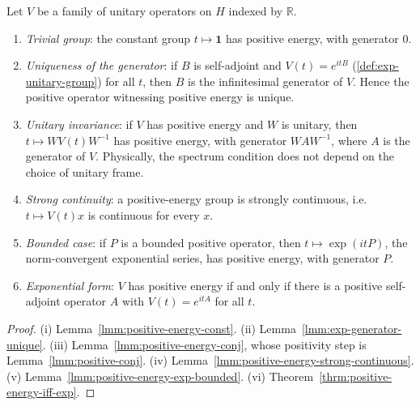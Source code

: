 \begin{theorem}
    \label{thrm:positive-energy-api}
    \leanok
    Let $V$ be a family of unitary operators on $H$ indexed by $\mathbb{R}$.
    \begin{enumerate}
        \item[(i)] \emph{Trivial group}: the constant group $t \mapsto \mathbf{1}$ has positive energy, with generator $0$.
        \item[(ii)] \emph{Uniqueness of the generator}: if $B$ is self-adjoint and $V(t) = e^{itB}$ (\ref{def:exp-unitary-group}) for all $t$, then $B$ is the infinitesimal generator of $V$. Hence the positive operator witnessing positive energy is unique.
        \item[(iii)] \emph{Unitary invariance}: if $V$ has positive energy and $W$ is unitary, then $t \mapsto WV(t)W^{-1}$ has positive energy, with generator $WAW^{-1}$, where $A$ is the generator of $V$. Physically, the spectrum condition does not depend on the choice of unitary frame.
        \item[(iv)] \emph{Strong continuity}: a positive-energy group is strongly continuous, i.e. $t \mapsto V(t)x$ is continuous for every $x$.
        \item[(v)] \emph{Bounded case}: if $P$ is a bounded positive operator, then $t \mapsto \exp(itP)$, the norm-convergent exponential series, has positive energy, with generator $P$.
        \item[(vi)] \emph{Exponential form}: $V$ has positive energy if and only if there is a positive self-adjoint operator $A$ with $V(t) = e^{itA}$ for all $t$.
    \end{enumerate}
\end{theorem}
\begin{proof}
    \leanok
    (i) Lemma~\ref{lmm:positive-energy-const}.
    (ii) Lemma~\ref{lmm:exp-generator-unique}.
    (iii) Lemma~\ref{lmm:positive-energy-conj}, whose positivity step is Lemma~\ref{lmm:positive-conj}.
    (iv) Lemma~\ref{lmm:positive-energy-strong-continuous}.
    (v) Lemma~\ref{lmm:positive-energy-exp-bounded}.
    (vi) Theorem~\ref{thrm:positive-energy-iff-exp}.
\end{proof}

